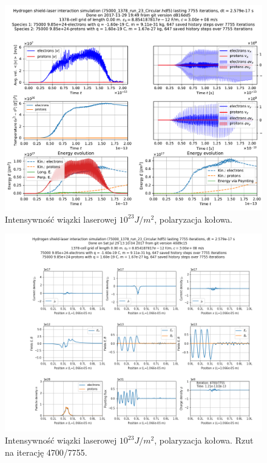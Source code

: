 \begin{figure}[h!]
  \includegraphics[width=\textwidth]{Images/75000_1378_run_23_Circular}
  \caption{Intensywność wiązki laserowej $10^{23} J/m^2$, polaryzacja kołowa.\label{fig:laser-23-Circular}}
\end{figure}

\begin{figure}[h!]
  \includegraphics[width=\textwidth]{Images/75000_1378_run_23_Circular_004700}
  \caption{Intensywność wiązki laserowej $10^{23} J/m^2$, polaryzacja kołowa. Rzut na iterację 4700/7755.\label{fig:laser-23-Circular-snapshot}}
\end{figure}


